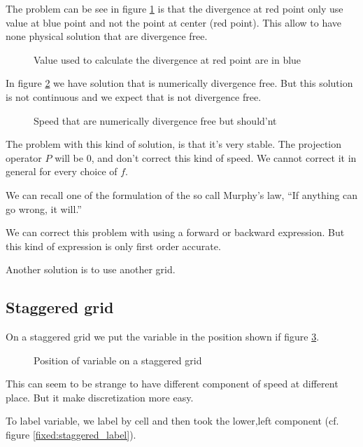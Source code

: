 The problem can be see in figure \ref{fixed:unstaggered_div} is that the divergence at red point only use value at blue point and not the point at center (red point).
This allow to have none physical solution that are divergence free.

\begin{figure}
\caption{Value used to calculate the divergence at red point are in blue}
\label{fixed:unstaggered_div}
\end{figure}

In figure \ref{fixed:unstaggered_div2} we have solution that is numerically divergence free. But this solution is not continuous and we expect that is not divergence free.

\begin{figure}
\caption{Speed that are numerically divergence free but should'nt}
\label{fixed:unstaggered_div2}
\end{figure}

The problem with this kind of solution, is that it's very stable.
The projection operator $P$ will be 0, and don't correct this kind of speed. We cannot correct it in general for every choice of $f$.

We can recall one of the formulation of the so call Murphy's law, ``If anything can go wrong, it will.''

We can correct this problem with using a forward or backward expression. But this kind of expression is only first order accurate.

Another solution is to use another grid.

\subsection{Staggered grid}

On a staggered grid we put the variable in the position shown if figure \ref{fixed:staggered}.

\begin{figure}
\caption{Position of variable on a staggered grid}
\label{fixed:staggered}
\end{figure}

This can seem to be strange to have different component of speed at different place. But it make discretization more easy.

To label variable, we label by cell and then took the lower,left component (cf. figure \ref{fixed:staggered_label}).

